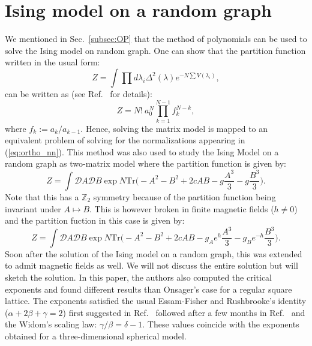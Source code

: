 \documentclass[letter,11pt]{article}
\begin{document}
\section{\label{sec:Ortho_pol1}Ising model on a random graph}
We mentioned in Sec.~\ref{subsec:OP} that the method of polynomials can be used to solve the Ising model on random graph. 
One can show that the partition function written in the usual form: 
\begin{equation}
	Z = \int \prod d\lambda_{i} \Delta^2(\lambda)  e^{-N \sum V(\lambda_i)}, 
\end{equation}
can be written as (see Ref.~\cite{DiFrancesco:1993cyw} for details): 
\begin{equation}
\label{eq:ZOP} 
	Z = N! ~ a_{0}^{N} \prod_{k=1}^{N-1} f_{k}^{N-k},
\end{equation}
where $f_{k} := a_{k}/a_{k-1}$. Hence, solving the matrix model is mapped to an 
equivalent problem of solving for the 
normalizations appearing in (\ref{eq:ortho_nn}). This method was also used to study the 
Ising Model on a random graph as two-matrix model 
\cite{Kazakov:1986hu} where the partition function is given by:
\begin{equation}
	\label{eq:Kaz1} 
	Z = \int \mathcal{D}A \mathcal{D}B \exp N \mbox{Tr} \Bigg(-A^2 -B^2 + 2c AB -g \frac{A^3}{3} - g\frac{B^3}{3}  \Bigg). 
\end{equation}
Note that this has a $\mathbb{Z}_{2}$ symmetry because of 
the partition function being invariant under $A \mapsto B$. This is however broken in finite magnetic fields ($h \neq 0$) and the partition fuction in this case is given by:
\begin{equation}
	\label{eq:RIsing1} 
	Z = \int \mathcal{D}A \mathcal{D}B \exp N \mbox{Tr} \Bigg(-A^2 -B^2 + 2c AB -g_{A}e^{h} \frac{A^3}{3} 
	- g_{B}e^{-h} \frac{B^3}{3}  \Bigg). 
\end{equation}
Soon after the solution of the Ising model on a random graph, this was extended to admit magnetic fields
\cite{Boulatov:1986sb} as well. We will not discuss the entire solution but will 
sketch the solution. In this paper, the authors also computed the critical exponents 
and found different results than Onsager's case for a regular square lattice. 
The exponents satisfied the usual Essam-Fisher and Rushbrooke's identity ($\alpha + 2\beta+\gamma=2$) 
first suggested in Ref.~\cite{Essam1963} followed after a few months in Ref.~\cite{Rushbrooke1963}
and the Widom's scaling law: $\gamma/\beta = \delta -1$. 
These values coincide with the exponents obtained for a three-dimensional spherical model. 
\end{document}
